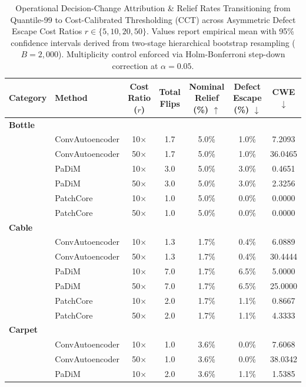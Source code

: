 \begin{table}[t]
\centering
\small
\vspace{-2mm}
\caption{Operational Decision-Change Attribution & Relief Rates Transitioning from Quantile-99 to Cost-Calibrated Thresholding (CCT) across Asymmetric Defect Escape Cost Ratios $r \in \{5, 10, 20, 50\}$. Values report empirical mean with 95\% confidence intervals derived from two-stage hierarchical bootstrap resampling ($B = 2,000$). Multiplicity control enforced via Holm-Bonferroni step-down correction at $\alpha = 0.05$.}
\label{tab:decision_changes}
\begin{tabular}{llccccc}
\toprule
\textbf{Category} & \textbf{Method} & \textbf{Cost Ratio ($r$)} & \textbf{Total Flips} & \textbf{Nominal Relief (\%)} $\uparrow$ & \textbf{Defect Escape (\%)} $\downarrow$ & \textbf{CWE} $\downarrow$ \\
\midrule
\multicolumn{7}{l}{\textbf{Bottle}} \\
 & ConvAutoencoder & 10$\times$ & 1.7 & 5.0\% & 1.0\% & 7.2093 \\
 & ConvAutoencoder & 50$\times$ & 1.7 & 5.0\% & 1.0\% & 36.0465 \\
 & PaDiM & 10$\times$ & 3.0 & 5.0\% & 3.0\% & 0.4651 \\
 & PaDiM & 50$\times$ & 3.0 & 5.0\% & 3.0\% & 2.3256 \\
 & PatchCore & 10$\times$ & 1.0 & 5.0\% & 0.0\% & 0.0000 \\
 & PatchCore & 50$\times$ & 1.0 & 5.0\% & 0.0\% & 0.0000 \\
\midrule
\multicolumn{7}{l}{\textbf{Cable}} \\
 & ConvAutoencoder & 10$\times$ & 1.3 & 1.7\% & 0.4\% & 6.0889 \\
 & ConvAutoencoder & 50$\times$ & 1.3 & 1.7\% & 0.4\% & 30.4444 \\
 & PaDiM & 10$\times$ & 7.0 & 1.7\% & 6.5\% & 5.0000 \\
 & PaDiM & 50$\times$ & 7.0 & 1.7\% & 6.5\% & 25.0000 \\
 & PatchCore & 10$\times$ & 2.0 & 1.7\% & 1.1\% & 0.8667 \\
 & PatchCore & 50$\times$ & 2.0 & 1.7\% & 1.1\% & 4.3333 \\
\midrule
\multicolumn{7}{l}{\textbf{Carpet}} \\
 & ConvAutoencoder & 10$\times$ & 1.0 & 3.6\% & 0.0\% & 7.6068 \\
 & ConvAutoencoder & 50$\times$ & 1.0 & 3.6\% & 0.0\% & 38.0342 \\
 & PaDiM & 10$\times$ & 2.0 & 3.6\% & 1.1\% & 1.5385 \\

\end{tabular}
\end{table}
